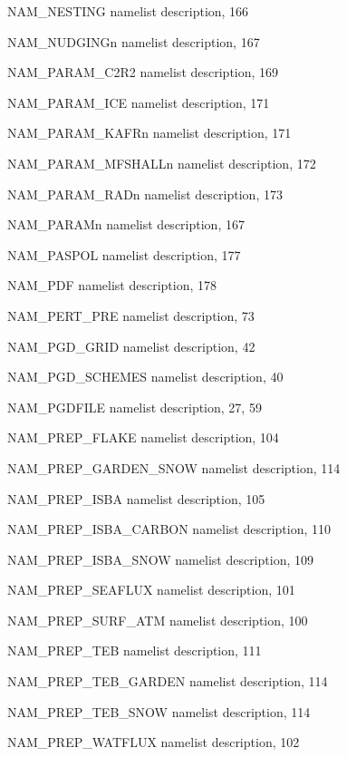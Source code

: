 \begin{theindex}
  \item NAM\_NESTING
    \subitem namelist description,  166
  \item NAM\_NUDGINGn
    \subitem namelist description,  167
  \item NAM\_PARAM\_C2R2
    \subitem namelist description,  169
  \item NAM\_PARAM\_ICE
    \subitem namelist description,  171
  \item NAM\_PARAM\_KAFRn
    \subitem namelist description,  171
  \item NAM\_PARAM\_MFSHALLn
    \subitem namelist description,  172
  \item NAM\_PARAM\_RADn
    \subitem namelist description,  173
  \item NAM\_PARAMn
    \subitem namelist description,  167
  \item NAM\_PASPOL
    \subitem namelist description,  177
  \item NAM\_PDF
    \subitem namelist description,  178
  \item NAM\_PERT\_PRE
    \subitem namelist description,  73
  \item NAM\_PGD\_GRID
    \subitem namelist description,  42
  \item NAM\_PGD\_SCHEMES
    \subitem namelist description,  40
  \item NAM\_PGDFILE
    \subitem namelist description,  27, 59
  \item NAM\_PREP\_FLAKE
    \subitem namelist description,  104
  \item NAM\_PREP\_GARDEN\_SNOW
    \subitem namelist description,  114
  \item NAM\_PREP\_ISBA
    \subitem namelist description,  105
  \item NAM\_PREP\_ISBA\_CARBON
    \subitem namelist description,  110
  \item NAM\_PREP\_ISBA\_SNOW
    \subitem namelist description,  109
  \item NAM\_PREP\_SEAFLUX
    \subitem namelist description,  101
  \item NAM\_PREP\_SURF\_ATM
    \subitem namelist description,  100
  \item NAM\_PREP\_TEB
    \subitem namelist description,  111
  \item NAM\_PREP\_TEB\_GARDEN
    \subitem namelist description,  114
  \item NAM\_PREP\_TEB\_SNOW
    \subitem namelist description,  114
  \item NAM\_PREP\_WATFLUX
    \subitem namelist description,  102

\end{theindex}
